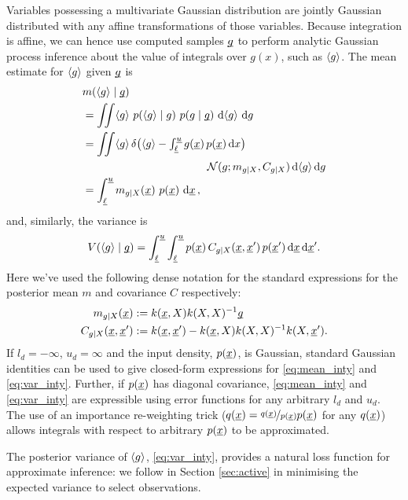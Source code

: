 \documentclass[twoside]{article}
\begin{document}
Variables possessing a multivariate Gaussian distribution are jointly Gaussian distributed with any affine transformations of those variables. Because integration is affine, we can hence use computed samples $\underline{\smash{g}}$ to perform analytic Gaussian process inference about the value of integrals over $g(x)$, such as $\langle g \rangle$. The mean estimate for $\langle g \rangle$ given $\underline{\smash{g}}$ is
%
\begin{align} 
&
\mean{\inty{g}}{\v{g}} 
\nonumber\\
& =\iint \inty{g}~\p{\inty{g}}{g}~\p{g}{\v{g}}~\ud \inty{g}~\ud g                                                                                                                                                               \nonumber\\
&
 =\iint \inty{g}\,\delta\bigl(\inty{g} - {\textstyle\int_{\vl}^{\vu} g(\vx)\,p(\vx)\,\ud x}\bigr)
\nonumber\\
& \hspace{4cm}
\N{g}{m_{g|X}}{C_{g|X}}\,\ud \inty{g} \,\ud g 
\nonumber\\
&
 = \int_{\vl}^{\vu} m_{g|X}(\vx)~p(\vx)~\ud \vx
\,, \label{eq:mean_inty}
\end{align}
and, similarly, the variance is
\begin{align} 
V(\langle g \rangle\mid\underline{\smash{g}})
=\int_{\underline{\smash{\ell}}}^{\underline{\smash{u}}}\int_{\underline{\smash{\ell}}}^{\underline{\smash{u}}} p(\underline{\smash{x}})\,C_{g|X}(\underline{\smash{x}}, \underline{\smash{x}}')\,p(\underline{\smash{x}}')\,\mathrm{d} \underline{\smash{x}}\,\mathrm{d} \underline{\smash{x}}'
. \label{eq:var_inty}
\end{align}
Here we've used the following dense notation for the standard \gp expressions for the posterior mean $m$ and covariance $C$ respectively:
\begin{align}
m_{g|X}(\underline{\smash{x}})& := k(\underline{\smash{x}}, X) k(X, X)^{-1} \underline{\smash{g}}\\
C_{g|X}(\underline{\smash{x}}, \underline{\smash{x}}')& := k(\underline{\smash{x}}, \underline{\smash{x}}') - k(\underline{\smash{x}}, X) k(X, X)^{-1} k(X, \underline{\smash{x}}').
\end{align}
If $l_d=-\infty$, $u_d=\infty$ and the input density, $p(\underline{\smash{x}})$, is Gaussian, standard Gaussian identities \citep{BZMonteCarlo} can be used to give closed-form expressions for \eqref{eq:mean_inty} and \eqref{eq:var_inty}. Further, if $p(\underline{\smash{x}})$ has diagonal covariance, \eqref{eq:mean_inty} and \eqref{eq:var_inty} are expressible using error functions for any arbitrary $l_d$ and $u_d$.
The use of an importance re-weighting trick ($q(\underline{\smash{x}}) = \nicefrac{q(\underline{\smash{x}})}{p(\underline{\smash{x}})} p(\underline{\smash{x}})$ for any $q(\underline{\smash{x}})$) allows integrals with respect to arbitrary $p(\underline{\smash{x}})$ to be approximated. 

The posterior variance of $\langle g \rangle$, \eqref{eq:var_inty}, provides a natural loss function for approximate inference: we follow \citet{osborne2012active} in Section \ref{sec:active} in minimising the expected variance to select observations. 
\end{document}
